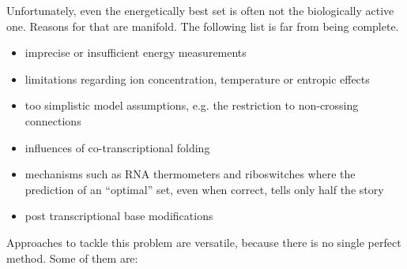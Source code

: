 \documentclass[paper=a4,fontsize=12pt]{scrartcl}
\begin{document}
Unfortunately, even the energetically best set is often not the biologically active one. Reasons for that are manifold. The following list is far from being complete. 
\begin{itemize}
	\item{imprecise or insufficient energy measurements \cite{MAT:TUR:2006}}
	\item{limitations regarding ion concentration, temperature or entropic effects}
	\item{too simplistic model assumptions, e.g. the restriction to non-crossing connections}
	\item{influences of co-transcriptional folding \cite{MEY:MIK:2004}}
	\item{mechanisms such as RNA thermometers and riboswitches \cite{MAN:BRE:2004,WAL:GAU:KLI:NAR:2009} where the prediction of an ``optimal'' set, even when correct, tells only half the story}
	\item{post transcriptional base modifications}
\end{itemize}
Approaches to tackle this problem are versatile, because there is no single perfect method. Some of them are: 
\end{document}
